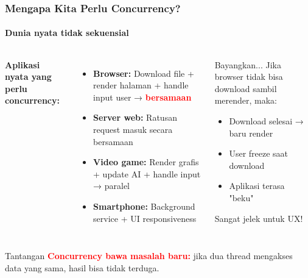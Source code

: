 \documentclass[t,aspectratio=169,xcolor=dvipsnames]{beamer}
\newcommand{\tem}[1]{\textbf{\textcolor{red}{#1}}}
\begin{document}
\begin{frame}
    \frametitle{Mengapa Kita Perlu Concurrency?}
    \framesubtitle{Dunia nyata tidak sekuensial}
    \footnotesize

    \begin{columns}[T]
        \textbf{Aplikasi nyata yang perlu concurrency:}
        \begin{itemize}
            \item \textbf{Browser:} Download file + render halaman + handle input user → \tem{bersamaan}
            \item \textbf{Server web:} Ratusan request masuk secara bersamaan
            \item \textbf{Video game:} Render grafis + update AI + handle input → paralel
            \item \textbf{Smartphone:} Background service + UI responsiveness
        \end{itemize}

        \begin{exampleblock}{Bayangkan...}
            Jika browser tidak bisa download sambil merender, maka:
            \begin{itemize}
                \item Download selesai → baru render
                \item User freeze saat download
                \item Aplikasi terasa "beku"
            \end{itemize}
            Sangat jelek untuk UX!
        \end{exampleblock}
    \end{columns}

    \vspace{0.2cm}
    \begin{alertblock}{Tantangan}
        \tem{Concurrency bawa masalah baru:} jika dua thread mengakses data yang sama, hasil bisa tidak terduga.
    \end{alertblock}
\end{frame}
\end{document}

